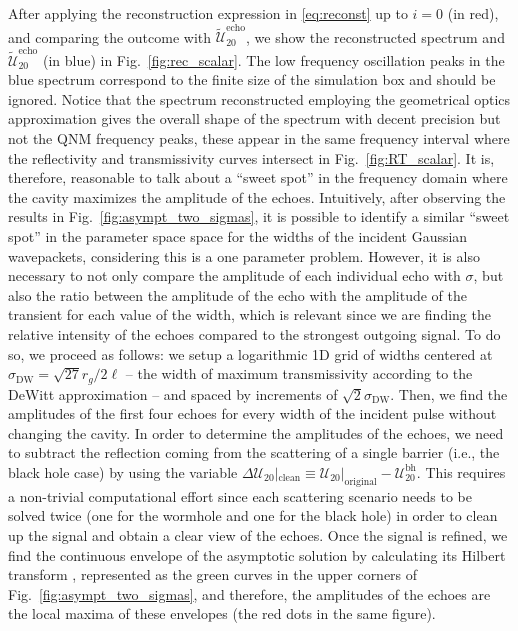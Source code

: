 \documentclass[article,aps,nofootinbib,twocolumn,superscriptaddress]{revtex4-1}
\begin{document}
After applying the reconstruction expression in \eqref{eq:reconst} up to $i=0$ (in red), and comparing the outcome with $\tilde{\mathcal{U}}_{20}^{\mathrm{echo}}$, we show the reconstructed spectrum and $\tilde{\mathcal{U}}_{20}^{\mathrm{echo}}$ (in blue) in Fig.~\ref{fig:rec_scalar}. The low frequency oscillation peaks in the blue spectrum correspond to the finite size of the simulation box and should be ignored. Notice that the spectrum reconstructed employing the geometrical optics approximation gives the overall shape of the spectrum with decent precision but not the QNM frequency peaks, these appear in the same frequency interval where the reflectivity and transmissivity curves intersect in Fig.~\ref{fig:RT_scalar}. It is, therefore, reasonable to talk about a ``sweet spot'' in the frequency domain where the cavity maximizes the amplitude of the echoes. Intuitively, after observing the results in Fig.~\ref{fig:asympt_two_sigmas}, it is possible to identify a similar ``sweet spot'' in the parameter space space for the widths of the incident Gaussian wavepackets, considering this is a one parameter problem. However, it is also necessary to not only compare the amplitude of each individual echo with $\sigma$, but also the ratio between the amplitude of the echo with the amplitude of the transient for each value of the width, which is relevant since we are finding the relative intensity of the echoes compared to the strongest outgoing signal. To do so, we proceed as follows: we setup a logarithmic 1D grid of widths centered at $\sigma_{\mathrm{DW}}=\sqrt{27}r_g/2\ell$ --  the width of maximum transmissivity according to the DeWitt approximation \citep{DeWitt:1975ys} -- and spaced by increments of $\sqrt{2}\sigma_{\mathrm{DW}}$. Then, we find the amplitudes of the first four echoes for every width of the incident pulse without changing the cavity. In order to determine the amplitudes of the echoes, we need to subtract the reflection coming from the scattering of a single barrier (i.e., the black hole case) by using the variable $\Delta\mathcal{U}_{20}|_{\mathrm{clean}}\equiv\mathcal{U}_{20}|_{\mathrm{original}}-\mathcal{U}^{\mathrm{bh}}_{20}$. This requires a non-trivial computational effort since each scattering scenario needs to be solved twice (one for the wormhole and one for the black hole) in order to clean up the signal and obtain a clear view of the echoes. Once the signal is refined, we find the continuous envelope of the asymptotic solution by calculating its Hilbert transform \citep{1449626}, represented as the green curves in the upper corners of Fig.~\ref{fig:asympt_two_sigmas}, and therefore, the amplitudes of the echoes are the local maxima of these envelopes (the red dots in the same figure). 
\end{document}
